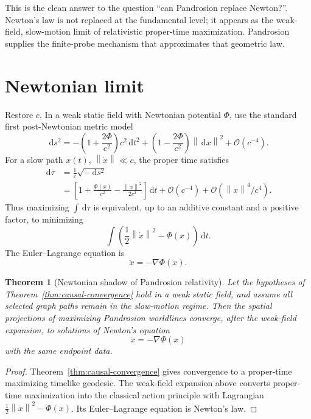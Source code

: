 \documentclass[11pt]{article}
\newtheorem{theorem}[definition]{Theorem}
\newcommand{\dd}{\,\mathrm d}
\newcommand{\Oterm}{\mathcal O}
\newcommand{\norm}[1]{\left\lVert #1\right\rVert}
\begin{document}
This is the clean answer to the question ``can Pandrosion replace Newton?''.
Newton's law is not replaced at the fundamental level; it appears as the
weak-field, slow-motion limit of relativistic proper-time maximization.
Pandrosion supplies the finite-probe mechanism that approximates that
geometric law.

\section{Newtonian limit}

Restore \(c\).  In a weak static field with Newtonian potential \(\Phi\), use
the standard first post-Newtonian metric model
\[
        \dd s^2
        =
        -
        \left(1+\frac{2\Phi}{c^2}\right)c^2\dd t^2
        +
        \left(1-\frac{2\Phi}{c^2}\right)\norm{\dd x}^2
        +
        \Oterm(c^{-4}).
\]
For a slow path \(x(t)\), \(\norm{\dot x}\ll c\), the proper time satisfies
\[
\begin{aligned}
        \dd\tau
        &=
        \frac{1}{c}\sqrt{-\dd s^2}
\\
        &=
        \left[
        1+\frac{\Phi(x)}{c^2}
        -
        \frac{\norm{\dot x}^2}{2c^2}
        \right]\dd t
        +
        \Oterm(c^{-4})+\Oterm(\norm{\dot x}^4/c^4).
\end{aligned}
\]
Thus maximizing \(\int\dd\tau\) is equivalent, up to an additive constant and a
positive factor, to minimizing
\[
        \int
        \left(
        \frac12\norm{\dot x}^2-\Phi(x)
        \right)\dd t.
\]
The Euler--Lagrange equation is
\[
        \ddot x=-\nabla\Phi(x).
\]

\begin{theorem}[Newtonian shadow of Pandrosion relativity]
Let the hypotheses of Theorem~\ref{thm:causal-convergence} hold in a weak
static field, and assume all selected graph paths remain in the slow-motion
regime.  Then the spatial projections of maximizing Pandrosion worldlines
converge, after the weak-field expansion, to solutions of Newton's equation
\[
        \ddot x=-\nabla\Phi(x)
\]
with the same endpoint data.
\end{theorem}

\begin{proof}
Theorem~\ref{thm:causal-convergence} gives convergence to a proper-time
maximizing timelike geodesic.  The weak-field expansion above converts
proper-time maximization into the classical action principle with Lagrangian
\(\frac12\norm{\dot x}^2-\Phi(x)\).  Its Euler--Lagrange equation is Newton's
law.
\end{proof}
\end{document}

